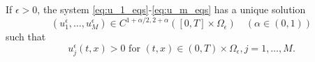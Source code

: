 \begin{theorem} 
    If $\epsilon>0$, the system \eqref{eq:u_1_eqs}-\eqref{eq:u_m_eqs} has a unique solution
    $$
    \left(u_{1}^{\epsilon}, \ldots, u_{M}^{\epsilon}\right) \in C^{1+\alpha / 2,2+\alpha}\left([0, T] \times \Omega_{\epsilon}\right) \quad(\alpha \in(0,1))
    $$
    such that
    $$
    u_{j}^{\epsilon}(t, x)>0 \text { for }(t, x) \in(0, T) \times \Omega_{\epsilon}, j=1, \ldots, M .
    $$
    \label{thm:3.1}
\end{theorem}

